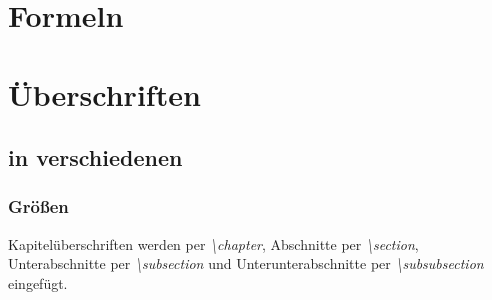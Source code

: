     \section{Formeln}

    \section{Überschriften}
    \subsection{in verschiedenen}
    \subsubsection{Größen}
    Kapitelüberschriften werden per \emph{\textbackslash chapter}, Abschnitte per \emph{\textbackslash section}, Unterabschnitte per \emph{\textbackslash subsection} und Unterunterabschnitte per \emph{\textbackslash subsubsection} eingefügt.

